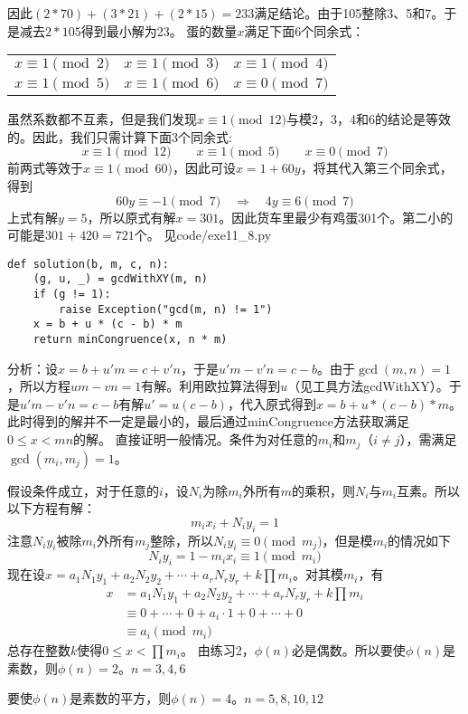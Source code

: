 因此$(2*70)+(3*21)+(2*15)=233$满足结论。由于105整除3、5和7。于是减去$2*105$得到最小解为23。
%
\exercise 蛋的数量$x$满足下面6个同余式：
\begin{center}
\begin{tabular}{ccc}
$x\equiv1\pmod2$ & $x\equiv1\pmod3$ & $x\equiv1\pmod4$ \\ 
$x\equiv1\pmod5$ & $x\equiv1\pmod6$ & $x\equiv0\pmod7$ \\ 
\end{tabular}
\end{center}
虽然系数都不互素，但是我们发现$x\equiv 1\pmod{12}$与模2，3，4和6的结论是等效的。因此，我们只需计算下面3个同余式:
\[x\equiv 1\pmod{12}\qquad x\equiv1\pmod5\qquad x\equiv0\pmod7\]
前两式等效于$x\equiv 1\pmod{60}$，因此可设$x=1+60y$，将其代入第三个同余式，得到
\[60y\equiv -1\pmod7\quad\Rightarrow\quad 4y\equiv 6\pmod7\]
上式有解$y=5$，所以原式有解$x=301$。因此货车里最少有鸡蛋301个。第二小的可能是$301+420=721$个。
%
\exercise 见code/exe11\_8.py
\begin{lstlisting}
def solution(b, m, c, n):
    (g, u, _) = gcdWithXY(m, n)
    if (g != 1):
        raise Exception("gcd(m, n) != 1")
    x = b + u * (c - b) * m
    return minCongruence(x, n * m)
\end{lstlisting}
分析：设$x = b + u'm = c + v'n$，于是$u'm - v'n = c - b$。由于$\gcd(m, n) = 1$，所以方程$um - vn = 1$有解。利用欧拉算法得到$u$（见工具方法gcdWithXY）。于是$u'm - v'n = c - b$有解$u'=u(c-b)$，代入原式得到$x = b + u * (c - b) * m$。此时得到的解并不一定是最小的，最后通过minCongruence方法获取满足$0\le x<mn$的解。
%
\exercise 直接证明一般情况。条件为对任意的$m_i$和$m_j$（$i\not=j$），需满足$\gcd(m_i, m_j) = 1$。\par
\proof 假设条件成立，对于任意的$i$，设$N_i$为除$m_i$外所有$m$的乘积，则$N_i$与$m_i$互素。所以以下方程有解：
\[m_ix_i + N_iy_i = 1\]
注意$N_iy_i$被除$m_i$外所有$m_j$整除，所以$N_iy_i\equiv0\pmod{m_j}$，但是模$m_i$的情况如下
\[N_iy_i = 1-m_ix_i\equiv 1\pmod{m_i}\]
现在设$x=a_1N_1y_1+a_2N_2y_2+\cdots + a_rN_ry_r + k\prod m_i$。对其模$m_i$，有
\begin{align*}
x &= a_1N_1y_1+a_2N_2y_2+\cdots + a_rN_ry_r+ k\prod m_i \\
&\equiv 0 + \cdots + 0 + a_i\cdot 1 + 0 + \cdots + 0 \\
&\equiv a_i\pmod{m_i}
\end{align*}
总存在整数$k$使得$0\le x < \prod m_i$。
%
\exercise 由练习2，$\phi(n)$必是偶数。所以要使$\phi(n)$是素数，则$\phi(n)=2$。$n=3,4,6$\par
要使$\phi(n)$是素数的平方，则$\phi(n)=4$。$n=5,8,10,12$
